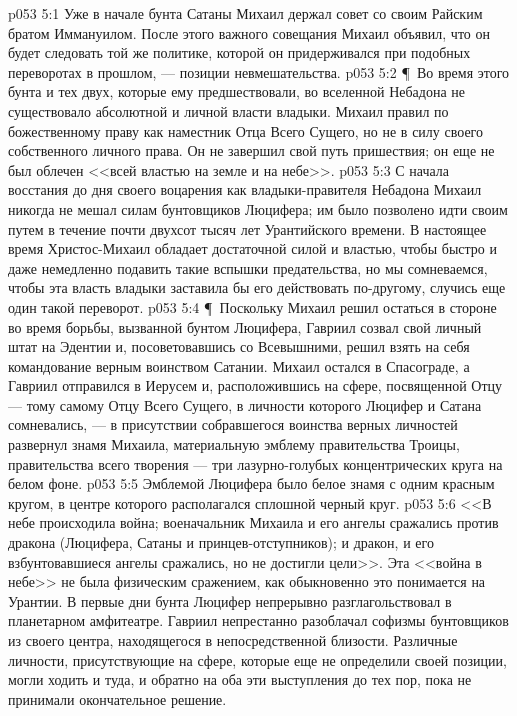 \vs p053 5:1 Уже в начале бунта Сатаны Михаил держал совет со своим Райским братом Иммануилом. После этого важного совещания Михаил объявил, что он будет следовать той же политике, которой он придерживался при подобных переворотах в прошлом, --- позиции невмешательства.
\vs p053 5:2 \P\ Во время этого бунта и тех двух, которые ему предшествовали, во вселенной Небадона не существовало абсолютной и личной власти владыки. Михаил правил по божественному праву как наместник Отца Всего Сущего, но не в силу своего собственного личного права. Он не завершил свой путь пришествия; он еще не был облечен <<всей властью на земле и на небе>>.
\vs p053 5:3 С начала восстания до дня своего воцарения как владыки\hyp{}правителя Небадона Михаил никогда не мешал силам бунтовщиков Люцифера; им было позволено идти своим путем в течение почти двухсот тысяч лет Урантийского времени. В настоящее время Христос\hyp{}Михаил обладает достаточной силой и властью, чтобы быстро и даже немедленно подавить такие вспышки предательства, но мы сомневаемся, чтобы эта власть владыки заставила бы его действовать по\hyp{}другому, случись еще один такой переворот.
\vs p053 5:4 \P\ Поскольку Михаил решил остаться в стороне во время борьбы, вызванной бунтом Люцифера, Гавриил созвал свой личный штат на Эдентии и, посоветовавшись со Всевышними, решил взять на себя командование верным воинством Сатании. Михаил остался в Спасограде, а Гавриил отправился в Иерусем и, расположившись на сфере, посвященной Отцу --- тому самому Отцу Всего Сущего, в личности которого Люцифер и Сатана сомневались, --- в присутствии собравшегося воинства верных личностей развернул знамя Михаила, материальную эмблему правительства Троицы, правительства всего творения --- три лазурно\hyp{}голубых концентрических круга на белом фоне.
\vs p053 5:5 Эмблемой Люцифера было белое знамя с одним красным кругом, в центре которого располагался сплошной черный круг.
\vs p053 5:6 <<В небе происходила война; военачальник Михаила и его ангелы сражались против дракона (Люцифера, Сатаны и принцев\hyp{}отступников); и дракон, и его взбунтовавшиеся ангелы сражались, но не достигли цели>>. Эта <<война в небе>> не была физическим сражением, как обыкновенно это понимается на Урантии. В первые дни бунта Люцифер непрерывно разглагольствовал в планетарном амфитеатре. Гавриил непрестанно разоблачал софизмы бунтовщиков из своего центра, находящегося в непосредственной близости. Различные личности, присутствующие на сфере, которые еще не определили своей позиции, могли ходить и туда, и обратно на оба эти выступления до тех пор, пока не принимали окончательное решение.
